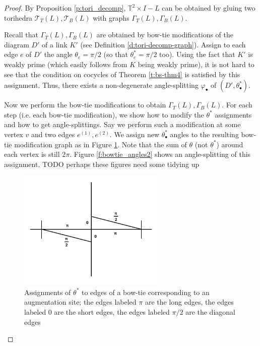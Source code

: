 \documentclass[11pt]{amsart}
\newcommand{\thmref}[1]{Theorem \ref{#1}}
\newcommand{\prpref}[1]{Proposition \ref{#1}}
\newcommand{\defref}[1]{Definition \ref{#1}}
\newcommand{\figref}[1]{Figure \ref{#1}}
\newcommand{\torus}{{\mathbb{T}^2}}
\newcommand{\sT}{{\mathcal{T}}}
\newcommand{\vphi}{\varphi}
\newcommand{\toruscomp}[1]{{\torus \times I - #1}}
\theoremstyle{plain}
\theoremstyle{definition}
\begin{document}
\begin{proof}
By \prpref{p:tori_decomp}, $\toruscomp{L}$ can be
obtained by gluing two torihedra $\sT_T(L),\sT_B(L)$
with graphs $\Gamma_T(L),\Gamma_B(L)$.


Recall that $\Gamma_T(L),\Gamma_B(L)$ are
obtained by bow-tie modifications of the diagram $D'$
of a link $K'$
(see \defref{d:tori-decomp-graph}).
Assign to each edge $e$ of $D'$ the angle $\theta_e = \pi/2$
(so that $\theta_e^* = \pi/2$ too).
Using the fact that $K'$ is weakly prime
(which easily follows from $K$ being weakly prime),
it is not hard to see that the condition on cocycles
of \thmref{t:bs-thm4} is satisfied by this assignment.
Thus, there exists a non-degenerate angle-splitting
$\vphi_\bullet$ of $(D',\theta_\bullet^*)$.


Now we perform the bow-tie modifications to obtain
$\Gamma_T(L),\Gamma_B(L)$.
For each step (i.e. each bow-tie modification),
we show how to modify the $\theta^*$ assignments
and how to get angle-splittings.
Say we perform such a modification
at some vertex $v$ and two edges $e^{(1)},e^{(2)}$.
We assign new $\theta_\bullet^*$ angles to
the resulting bow-tie modification graph
as in \figref{f:bowtie_angles}.
Note that the sum of $\theta$ (not $\theta^*$)
around each vertex is still $2\pi$.
\figref{f:bowtie_angles2} shows an angle-splitting
of this assignment.
TODO perhaps these figures need some tidying up

\begin{figure}
\includegraphics[width=7cm]{more_pictures/horizontal_bowtie.png}
\caption{Assignments of $\theta^*$ to edges of a bow-tie
	corresponding to an augmentation site;
	the edges labeled $\pi$ are the long edges,
	the edges labeled 0 are the short edges,
	the edges labeled $\pi/2$ are the diagonal edges}
\label{f:bowtie_angles}
\end{figure}


\end{proof}
\end{document}
